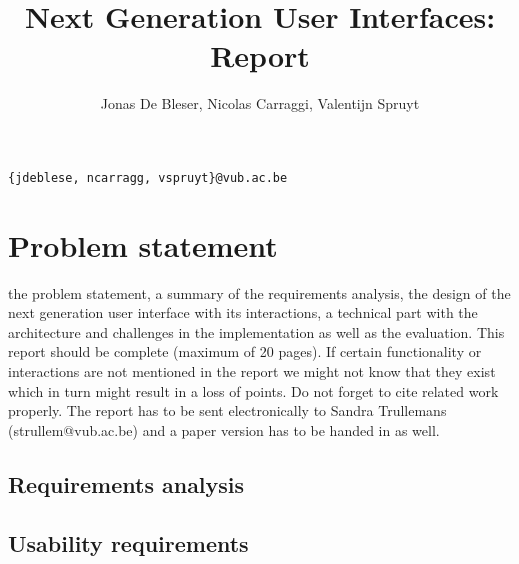 \documentclass{article}
\title{Next Generation User Interfaces: Report}
\begin{document}
\maketitle

\author{Jonas De Bleser, Nicolas Carraggi, Valentijn Spruyt}
\newline
\centerline{\texttt{\{jdeblese, ncarragg, vspruyt\}@vub.ac.be}}
\newline

\tableofcontents

\section{Problem statement}
the problem statement, a summary of the
requirements analysis, the design of the next generation user interface with its interactions, a technical
part with the architecture and challenges in the implementation as well as the evaluation. This report
should be complete (maximum of 20 pages). If certain functionality or interactions are not mentioned
in the report we might not know that they exist which in turn might result in a loss of points. Do not
forget to cite related work properly. The report has to be sent electronically to Sandra Trullemans
(strullem@vub.ac.be) and a paper version has to be handed in as well.
\subsection{Requirements analysis}

\subsection{Usability requirements}
\end{document}
